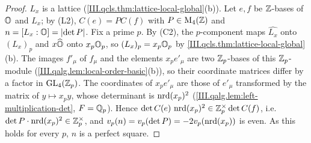 \begin{lemma}
\end{lemma}
\begin{proof}
$L_x$ is a lattice (\cref{III.qcls.thm:lattice-local-global}(b)). Let $e,f$ be $\mathbb{Z}$-bases of $\mathbb{O}$ and $L_x$; by (L2), $C(e)=PC(f)$ with $P\in\mathrm{M}_4(\mathbb{Z})$ and
$n=[L_x:\mathbb{O}]=\lvert\det P\rvert$. Fix a prime $p$. By (C2), the $p$-component maps $\widehat{L_x}$ onto $(L_x)_p$ and $x\widehat{\mathbb{O}}$ onto $x_p\mathbb{O}_p$, so
$(L_x)_p=x_p\mathbb{O}_p$ by \cref{III.qcls.thm:lattice-local-global}(b). The images $f'_\mu$ of $f_\mu$ and the elements $x_pe'_\mu$ are two $\mathbb{Z}_p$-bases of this
$\mathbb{Z}_p$-module (\cref{III.qalg.lem:local-order-basic}(b)), so their coordinate matrices differ by a factor in $\mathrm{GL}_4(\mathbb{Z}_p)$. The coordinates of $x_pe'_\mu$ are
those of $e'_\mu$ transformed by the matrix of $y\mapsto x_py$, whose determinant is $\operatorname{nrd}(x_p)^2$ (\cref{III.qalg.lem:left-multiplication-det}, $F=\mathbb{Q}_p$).
Hence $\det C(e)\,\operatorname{nrd}(x_p)^2\in\mathbb{Z}_p^\times\det C(f)$, i.e.\ $\det P\cdot\operatorname{nrd}(x_p)^2\in\mathbb{Z}_p^\times$, and $v_p(n)=v_p(\det P)=-2v_p(\operatorname{nrd}(x_p))$ is even. As this holds for
every $p$, $n$ is a perfect square.
\end{proof}

